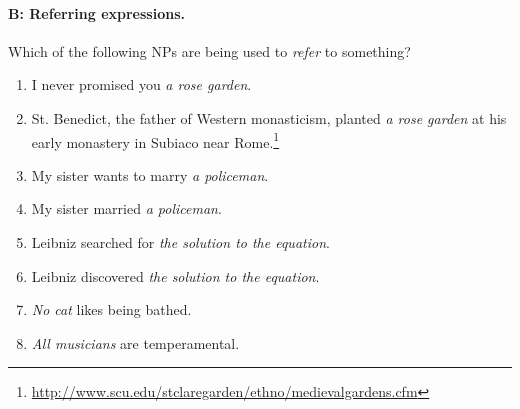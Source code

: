 {\paragraph*{B: Referring expressions.}

Which of the following NPs are being used to \textit{refer} to something?

\begin{enumerate}[label=\alph*.]
\item I never promised you \textit{a rose garden}.
\item St. Benedict, the father of Western monasticism, planted \textit{a rose garden} at his early monastery in Subiaco near Rome.\footnote{\url{http://www.scu.edu/stclaregarden/ethno/medievalgardens.cfm}}
\item My sister wants to marry \textit{a policeman}.
\item My sister married \textit{a policeman}.
\item Leibniz searched for \textit{the solution to the equation}.
\item Leibniz discovered \textit{the solution to the equation}.
\item \textit{No cat} likes being bathed.
\item \textit{All musicians} are temperamental.
\end{enumerate}
}
